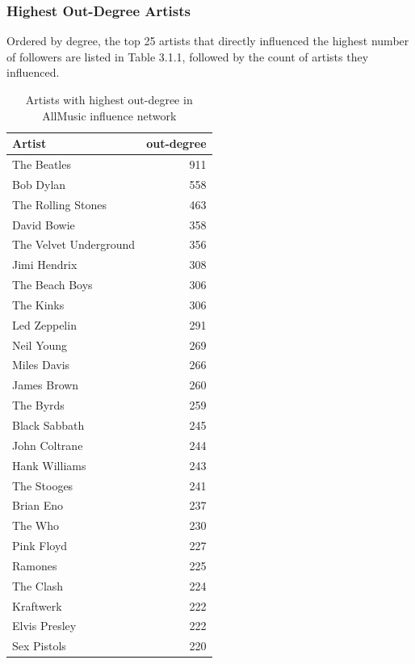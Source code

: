 \subsubsection*{Highest Out-Degree Artists}
Ordered by degree, the top 25 artists that directly influenced the highest number of followers are listed in Table 3.1.1, followed by the count of artists they influenced.


\begin{table}[H]
\centering
\caption{Artists with highest out-degree in AllMusic influence network}
\label{my-label}
\begin{tabular}{lr}
\hline
 Artist                 &   out-degree \\
\hline
 The Beatles            &         911 \\
 Bob Dylan              &         558 \\
 The Rolling Stones     &         463 \\
 David Bowie            &         358 \\
 The Velvet Underground &         356 \\
 Jimi Hendrix           &         308 \\
 The Beach Boys         &         306 \\
 The Kinks              &         306 \\
 Led Zeppelin           &         291 \\
 Neil Young             &         269 \\
 Miles Davis            &         266 \\
 James Brown            &         260 \\
 The Byrds              &         259 \\
 Black Sabbath          &         245 \\
 John Coltrane          &         244 \\
 Hank Williams          &         243 \\
 The Stooges            &         241 \\
 Brian Eno              &         237 \\
 The Who                &         230 \\
 Pink Floyd             &         227 \\
 Ramones                &         225 \\
 The Clash              &         224 \\
 Kraftwerk              &         222 \\
 Elvis Presley          &         222 \\
 Sex Pistols            &         220 \\
\hline
\end{tabular}
\end{table}

